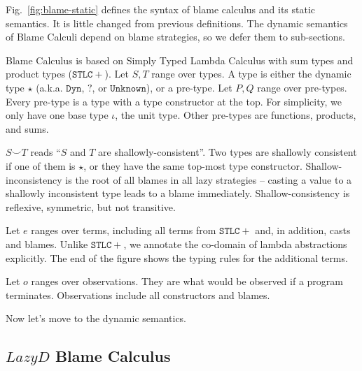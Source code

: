 \documentclass[acmsmall,review,anonymous]{acmart}\settopmatter{printfolios=true,printccs=false,printacmref=false}
\newcommand{\figref}[1]{Fig.~\ref{#1}}
\begin{document}
\figref{fig:blame-static} defines the syntax of blame calculus and its static 
semantics. It is little changed from previous definitions. 
The dynamic semantics of Blame Calculi depend on blame strategies, so we defer 
them to sub-sections.

Blame Calculus is based on Simply Typed Lambda Calculus with sum types and 
product types ($ \mathtt{STLC+} $). 
Let $ S,T $ range over types. A type is either the dynamic type $ \star $
(a.k.a. $ \mathtt{Dyn} $, $ \mathbb{?} $, or $ \mathtt{Unknown} $), 
or a pre-type. 
Let $ P,Q $ range over pre-types. Every pre-type is a type with a type 
constructor at the top. For simplicity, we only have one base type $ \iota $, 
the unit type. Other pre-types are functions, products, and sums.


$ S \smile T $ reads ``$ S $ and $ T $ are shallowly-consistent''. Two types 
are shallowly consistent if one of them is $ \star $, or they have the same 
top-most type constructor. Shallow-inconsistency is the root of all blames in 
all lazy strategies -- casting a value to a shallowly inconsistent type leads 
to a blame immediately. Shallow-consistency is reflexive, symmetric, but 
not transitive.

Let $ e $ ranges over terms, including all terms from $ \mathtt{STLC+} $ and, 
in addition, casts and blames. Unlike $ \mathtt{STLC+} $, we annotate the 
co-domain of lambda abstractions explicitly. 
The end of the figure shows the typing rules for the additional terms.

Let $ o $ ranges over observations. They are what would be observed if a 
program terminates. Observations include all constructors and blames.

Now let's move to the dynamic semantics. 

\subsection{$Lazy D$ Blame Calculus}
\end{document}
